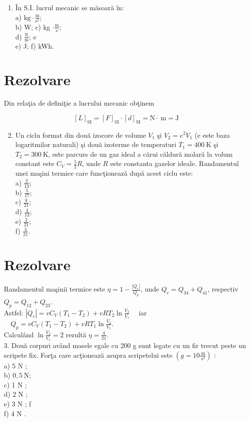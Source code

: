 
\begin{enumerate}
  \item În S.I. lucrul mecanic se măsoară în:\\
a) $\mathrm{kg} \cdot \frac{\mathrm{m}}{\mathrm{s}^{2}}$;\\
b) W; c) kg $\cdot \frac{\mathrm{m}}{\mathrm{s}}$;\\
d) $\frac{\mathrm{N}}{\mathrm{m}}$; e\\
e) J; f) kWh.
\end{enumerate}

\section*{Rezolvare}
Din relaţia de definiţie a lucrului mecanic obţinem

$$
[L]_{\mathrm{SI}}=[F]_{\mathrm{SI}} \cdot[d]_{\mathrm{SI}}=\mathrm{N} \cdot \mathrm{~m}=\mathrm{J}
$$

\begin{enumerate}
  \setcounter{enumi}{1}
  \item Un ciclu format din două izocore de volume $V_{1}$ şi $V_{2}=e^{2} V_{1}$ (e este baza logaritmilor naturali) şi două izoterme de temperaturi $T_{1}=400 \mathrm{~K}$ şi $T_{2}=300 \mathrm{~K}$, este parcurs de un gaz ideal a cărui căldură molară la volum constant este $C_{V}=\frac{5}{2} R$, unde $R$ este constanta gazelor ideale. Randamentul unei maşini termice care funcţionează după acest ciclu este:\\
a) $\frac{2}{13}$;\\
b) $\frac{5}{17}$;\\
c) $\frac{8}{21}$;\\
d) $\frac{4}{13}$;\\
e) $\frac{2}{21}$;\\
f) $\frac{4}{21}$.
\end{enumerate}

\section*{Rezolvare}
Randamentul maşinii termice este $\eta=1-\frac{\left|Q_{c}\right|}{Q_{p}}$, unde $Q_{c}=Q_{34}+Q_{41}$, respectiv $Q_{p}=Q_{12}+Q_{23}$.\\
Astfel: $\left|Q_{c}\right|=v C_{V}\left(T_{1}-T_{2}\right)+v R T_{2} \ln \frac{V_{2}}{V_{1}} \quad$ iar $\quad Q_{p}=v C_{V}\left(T_{1}-T_{2}\right)+v R T_{1} \ln \frac{V_{2}}{V_{1}}$.\\
Calculând $\ln \frac{V_{2}}{V_{1}}=2$ rezultă $\eta=\frac{4}{21}$.\\
3. Două corpuri având masele egale cu 200 g sunt legate cu un fir trecut peste un scripete fix. Forţa care acţionează asupra scripetelui este $\left(g=10 \frac{\mathrm{~m}}{\mathrm{~s}^{2}}\right)$ :\\
a) 5 N ;\\
b) $0,5 \mathrm{~N}$;\\
c) 1 N ;\\
d) 2 N ;\\
e) 3 N ; f\\
f) 4 N .

